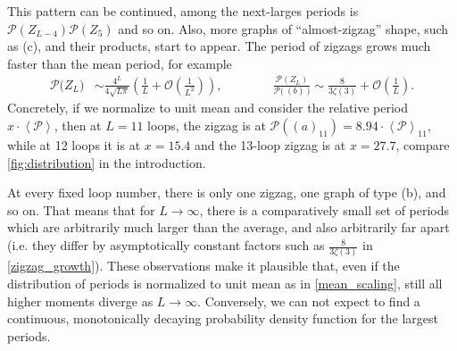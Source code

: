 \documentclass[12pt,a4paper]{article}
\newcommand{\period}{\mathcal P}
\renewcommand{\|}{\rule[-0.4ex]{0.2ex}{1.2em}}
\begin{document}
This pattern can be continued, among the next-larges periods is $\period (Z_{L-4}) \period (Z_5)$ and so on. Also, more graphs of \enquote{almost-zigzag} shape, such as (c), and their products, start to appear. The period of zigzags grows much faster than the mean period, for example
\begin{align}\label{zigzag_growth}
	\period \big( Z_L\big) &\sim \frac{4^L}{4\sqrt{L\pi}}\left( \frac 1 L +  \mathcal{O}\left( \frac 1 {L^2} \right)   \right) , \qquad \qquad 
	\frac{\period (Z_L)}{\period \big(  ~(b)~\big)} \sim \frac{8}{3\zeta(3)}+ \mathcal{O}\left( \frac 1 L \right)  .
\end{align}
Concretely, if we normalize to unit mean and consider the relative period $x \cdot \left \langle \period \right \rangle $, then at $L=11$ loops, the zigzag is at $\period( (a)_{11} )=8.94 \cdot \left \langle \period \right \rangle _{11}$, while at 12 loops it is at $x=15.4$ and the 13-loop zigzag is at $x=27.7$, compare \cref{fig:distribution} in the introduction.

At every fixed loop number, there is only one zigzag, one graph of type (b), and so on. That means that for $L\rightarrow \infty$, there is a comparatively small set of periods which are arbitrarily much larger than the average, and also arbitrarily far apart (i.e. they differ by asymptotically constant factors such as $\frac 8{3\zeta(3)}$ in \cref{zigzag_growth}).
These observations make it plausible that, even if the distribution of periods is normalized to unit mean as in \cref{mean_scaling}, still all higher moments diverge as $L\rightarrow \infty$. Conversely, we can not expect to find a continuous, monotonically decaying probability density function for the largest periods.
\end{document}
